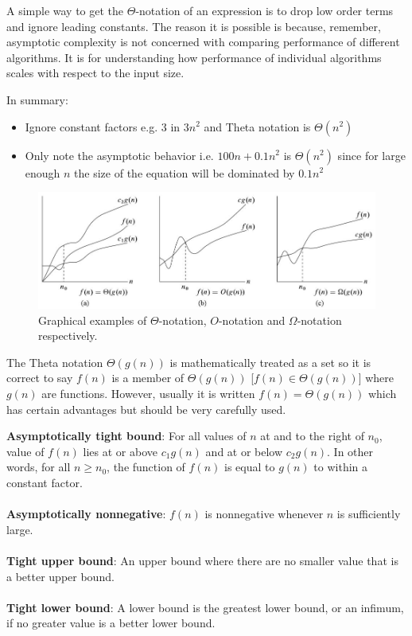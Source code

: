 \documentclass[10pt,a4paper]{article}
\begin{document}
A simple way to get the $\Theta$-notation of an expression is to drop low order terms
and ignore leading constants. The reason it is possible is because, remember,
asymptotic complexity is not concerned with comparing performance of different algorithms. It is for
understanding how performance of individual algorithms scales with respect to the input size.

In summary:
\begin{itemize}
    \item Ignore constant factors e.g. 3 in $3n^2$ and Theta notation is $\Theta(n^2)$
    \item Only note the asymptotic behavior i.e. $100n + 0.1n^2$ is $\Theta(n^2)$ since for
    large enough $n$ the size of the equation will be dominated by $0.1n^2$
\end{itemize}

\begin{figure} [h!]
    \centering
    \includegraphics[scale=0.5]{Theta-notation.JPG}
    \caption{Graphical examples of $\Theta$-notation, $O$-notation and $\Omega$-notation respectively.}
\end{figure}

\pagebreak

The Theta notation $\Theta(g(n))$ is mathematically treated as a set so it is
correct to say $f(n)$ is a member of $\Theta(g(n))$ [$f(n) \in \Theta(g(n))$] where $g(n)$
are functions. However, usually it is written $f(n)=\Theta(g(n))$ which has certain advantages but
should be very carefully used. 

\begin{tcolorbox}[breakable,colback=white]
\textbf{Asymptotically tight bound}: For all values of $n$ at and to the right of $n_0$, value of
$f(n)$ lies at or above $c_1g(n)$ and at or below $c_2g(n)$. In other words, for all $n\geq n_0$,
the function of $f(n)$ is equal to $g(n)$ to within a constant factor.
\\
\\
\textbf{Asymptotically nonnegative}: $f(n)$ is nonnegative whenever $n$ is sufficiently large.
\\
\\
\textbf{Tight upper bound}: An upper bound where there are no smaller value that is a better upper
bound. 
\\
\\
\textbf{Tight lower bound}: A lower bound is the greatest lower bound, or an infimum, if no greater
value is a better lower bound. 
\end{tcolorbox}
\end{document}
